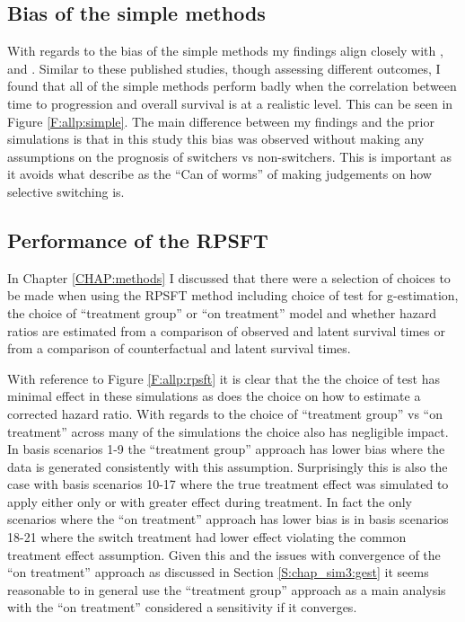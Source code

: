 \subsection{Bias of the simple methods}

With regards to the bias of the simple methods my findings align closely with \cite{Morden2011}, \cite{Latimer2013} and \cite{Latimer2016}. Similar to these published studies, though assessing different outcomes, I found that all of the simple methods perform badly when the correlation between time to progression and overall survival is at a realistic level. This can be seen in Figure \ref{F:allp:simple}. The main difference between my findings and the prior simulations is that in this study this bias was observed without making any assumptions on the prognosis of switchers vs non-switchers. This is important as it avoids what \cite{Slaets2013} describe as the ``Can of worms'' of making judgements on how selective switching is.

\subsection{Performance of the RPSFT}

In Chapter \ref{CHAP:methods} I discussed that there were a selection of choices to be made when using the RPSFT method including choice of test for g-estimation, the choice of ``treatment group'' or ``on treatment'' model and whether hazard ratios are estimated from a comparison of observed and latent survival times or from a comparison of counterfactual and latent survival times. 

With reference to Figure \ref{F:allp:rpsft} it is clear that the the choice of test has minimal effect in these simulations as does the choice on how to estimate a corrected hazard ratio. With regards to the choice of ``treatment group'' vs ``on treatment'' across many of the simulations the choice also has negligible impact. In basis scenarios 1-9 the ``treatment group'' approach has lower bias where the data is generated consistently with this assumption. Surprisingly this is also the case with basis scenarios 10-17 where the true treatment effect was simulated to apply either only or with greater effect during treatment. In fact the only scenarios where the ``on treatment'' approach has lower bias is in basis scenarios 18-21 where the switch treatment had lower effect violating the common treatment effect assumption. Given this and the issues with convergence of the ``on treatment'' approach as discussed in Section \ref{S:chap_sim3:gest} it seems reasonable to in general use the ``treatment group'' approach as a main analysis with the ``on treatment'' considered a sensitivity if it converges. 


